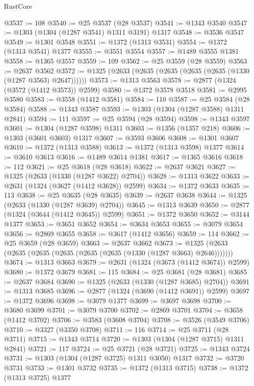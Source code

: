 \begin{lexlean}{RustCore}
\begin{coremodule}
@3537 := 108
@3540 := @25 @3537 (@28 @3537)
@3541 := @1343 @3540
@3547 := @1303 (@1304 (@1287 @3541) @1311 @3191) @1317
@3548 := @3536 @3547
@3549 := @1301 @3548
@3551 := @1372 (@1313 @3531)
@3554 := @1372 (@1313 @3541) @1377
@3555 := @3551 @3554
@3557 := @1489 @3555 @1381
@3558 := @1365 @3557
@3559 := 109
@3562 := @25 @3559 (@28 @3559)
@3563 := @2637 @3562
@3572 := @1325 (@2633 (@2635 (@2635 (@2635 (@2635 (@1330 (@1287 @3563) @2647))))))
@3573 := @1313 @3563
@3578 := @2877 (@1324 (@3572 (@1412 @3573)) @2599)
@3580 := @1372 @3578 @3518
@3581 := @2995 @3580
@3583 := @3558 (@1412 @3581)
@3584 := 110
@3587 := @25 @3584 (@28 @3584)
@3588 := @1343 @3587
@3593 := @1303 (@1304 (@1287 @3588) @1311 @2841)
@3594 := 111
@3597 := @25 @3594 (@28 @3594)
@3598 := @1343 @3597
@3601 := @1304 (@1287 @3598) @1311
@3603 := @1356 (@1357 @218)
@3606 := @1303 (@3601 @3603) @1317
@3607 := @3593 @3606
@3608 := @1301 @3607
@3610 := @1372 (@1313 @3588)
@3613 := @1372 (@1313 @3598) @1377
@3614 := @3610 @3613
@3616 := @1489 @3614 @1381
@3617 := @1365 @3616
@3618 := 112
@3621 := @25 @3618 (@28 @3618)
@3622 := @2637 @3621
@3627 := @1325 (@2633 (@1330 (@1287 @3622) @2704))
@3628 := @1313 @3622
@3633 := @2631 (@1324 (@3627 (@1412 @3628)) @2599)
@3634 := @1372 @3633
@3635 := 113
@3638 := @25 @3635 (@28 @3635)
@3639 := @2637 @3638
@3644 := @1325 (@2633 (@1330 (@1287 @3639) @2704))
@3645 := @1313 @3639
@3650 := @2877 (@1324 (@3644 (@1412 @3645)) @2599)
@3651 := @1372 @3650
@3652 := @3144 @1377
@3653 := @3651 @3652
@3654 := @3634 @3653
@3655 := @3079 @3654
@3656 := @2869 @3655
@3658 := @3617 (@1412 @3656)
@3659 := 114
@3662 := @25 @3659 (@28 @3659)
@3663 := @2637 @3662
@3673 := @1325 (@2633 (@2635 (@2635 (@2635 (@2635 (@2635 (@1330 (@1287 @3663) @2646)))))))
@3674 := @1313 @3663
@3679 := @2631 (@1324 (@3673 (@1412 @3674)) @2599)
@3680 := @1372 @3679
@3681 := 115
@3684 := @25 @3681 (@28 @3681)
@3685 := @2637 @3684
@3690 := @1325 (@2633 (@1330 (@1287 @3685) @2704))
@3691 := @1313 @3685
@3696 := @2877 (@1324 (@3690 (@1412 @3691)) @2599)
@3697 := @1372 @3696
@3698 := @3079 @1377
@3699 := @3697 @3698
@3700 := @3680 @3699
@3701 := @3079 @3700
@3702 := @2869 @3701
@3704 := @3658 (@1412 @3702)
@3706 := @3583 (@3608 @3704)
@3708 := @3526 (@3549 @3706)
@3710 := @3327 (@3350 @3708)
@3711 := 116
@3714 := @25 @3711 (@28 @3711)
@3715 := @1343 @3714
@3720 := @1303 (@1304 (@1287 @3715) @1311 @2841)
@3721 := 117
@3724 := @25 @3721 (@28 @3721)
@3725 := @1343 @3724
@3731 := @1303 (@1304 (@1287 @3725) @1311 @3050) @1317
@3732 := @3720 @3731
@3733 := @1301 @3732
@3735 := @1372 (@1313 @3715)
@3738 := @1372 (@1313 @3725) @1377

\end{coremodule}
\end{lexlean}
